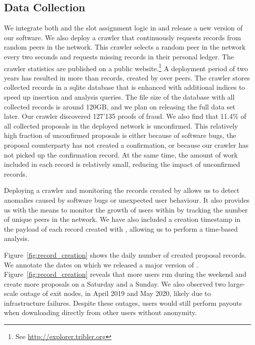 \subsection{Data Collection}
We integrate both \TrustChain{} and the slot assignment logic in \Tribler{} and release a new version of our software.
We also deploy a crawler that continuously requests \TrustChain{} records from random peers in the \Tribler{} network.
This crawler selects a random peer in the \TrustChain{} network every two seconds and requests missing records in their personal ledger.
The crawler statistics are published on a public website.\footnote{See \url{http://explorer.tribler.org}}
A deployment period of two years has resulted in more than \TrialRecords{} records, created by over \TrialUsers{} peers.
The crawler stores collected records in a sqlite database that is enhanced with additional indices to speed up insertion and analysis queries.
The file size of the database with all collected records is around 120GB, and we plan on releasing the full data set later.
Our crawler discovered 127'135 proofs of fraud.
We also find that 11.4\% of all collected proposals in the deployed \TrustChain{} network is unconfirmed.
This relatively high fraction of unconfirmed proposals is either because of software bugs, the proposal counterparty has not created a confirmation, or because our crawler has not picked up the confirmation record.
At the same time, the amount of work included in each record is relatively small, reducing the impact of unconfirmed records.

Deploying a crawler and monitoring the records created by \TrustChain{} allows us to detect anomalies caused by software bugs or unexpected user behaviour.
It also provides us with the means to monitor the growth of users within \Tribler{} by tracking the number of unique peers in the \TrustChain{} network.
We have also included a creation timestamp in the payload of each record created with \Tribler{}, allowing us to perform a time-based analysis.

Figure~\ref{fig:record_creation} shows the daily number of created proposal records.
We annotate the dates on which we released a major version of \Tribler{}.
Figure~\ref{fig:record_creation} reveals that more users run \Tribler{} during the weekend and create more proposals on a Saturday and a Sunday.
We also observed two large-scale outage of exit nodes, in April 2019 and May 2020, likely due to infrastructure failures.
Despite these outages, users would still perform payouts when downloading directly from other \Tribler{} users without anonymity.

